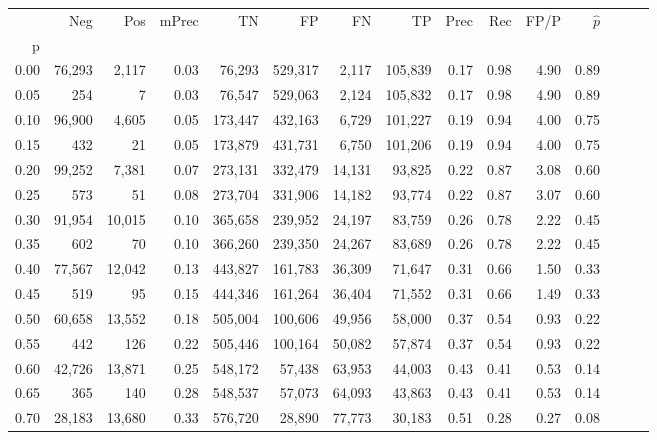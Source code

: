 \begin{tabular}{rrrrrrrrrrrrrrr}
\toprule
{} &     Neg &     Pos & mPrec &       TN &       FP &       FN &       TP &  Prec &   Rec &  FP/P & $\hat{p}$ \\
p    &         &         &       &          &          &          &          &       &       &       &           \\
\midrule
0.00 &  76,293 &   2,117 &  0.03 &   76,293 &  529,317 &    2,117 &  105,839 &  0.17 &  0.98 &  4.90 &      0.89 \\
0.05 &     254 &       7 &  0.03 &   76,547 &  529,063 &    2,124 &  105,832 &  0.17 &  0.98 &  4.90 &      0.89 \\
0.10 &  96,900 &   4,605 &  0.05 &  173,447 &  432,163 &    6,729 &  101,227 &  0.19 &  0.94 &  4.00 &      0.75 \\
0.15 &     432 &      21 &  0.05 &  173,879 &  431,731 &    6,750 &  101,206 &  0.19 &  0.94 &  4.00 &      0.75 \\
0.20 &  99,252 &   7,381 &  0.07 &  273,131 &  332,479 &   14,131 &   93,825 &  0.22 &  0.87 &  3.08 &      0.60 \\
0.25 &     573 &      51 &  0.08 &  273,704 &  331,906 &   14,182 &   93,774 &  0.22 &  0.87 &  3.07 &      0.60 \\
0.30 &  91,954 &  10,015 &  0.10 &  365,658 &  239,952 &   24,197 &   83,759 &  0.26 &  0.78 &  2.22 &      0.45 \\
0.35 &     602 &      70 &  0.10 &  366,260 &  239,350 &   24,267 &   83,689 &  0.26 &  0.78 &  2.22 &      0.45 \\
0.40 &  77,567 &  12,042 &  0.13 &  443,827 &  161,783 &   36,309 &   71,647 &  0.31 &  0.66 &  1.50 &      0.33 \\
0.45 &     519 &      95 &  0.15 &  444,346 &  161,264 &   36,404 &   71,552 &  0.31 &  0.66 &  1.49 &      0.33 \\
0.50 &  60,658 &  13,552 &  0.18 &  505,004 &  100,606 &   49,956 &   58,000 &  0.37 &  0.54 &  0.93 &      0.22 \\
0.55 &     442 &     126 &  0.22 &  505,446 &  100,164 &   50,082 &   57,874 &  0.37 &  0.54 &  0.93 &      0.22 \\
0.60 &  42,726 &  13,871 &  0.25 &  548,172 &   57,438 &   63,953 &   44,003 &  0.43 &  0.41 &  0.53 &      0.14 \\
0.65 &     365 &     140 &  0.28 &  548,537 &   57,073 &   64,093 &   43,863 &  0.43 &  0.41 &  0.53 &      0.14 \\
0.70 &  28,183 &  13,680 &  0.33 &  576,720 &   28,890 &   77,773 &   30,183 &  0.51 &  0.28 &  0.27 &      0.08 \\

\end{tabular}
